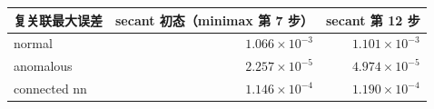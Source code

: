 \begin{tabular}{lrr}
\toprule
复关联最大误差 & secant 初态（minimax 第 7 步） & secant 第 12 步 \\
\midrule
normal & $1.066\times10^{-3}$ & $1.101\times10^{-3}$ \\
anomalous & $2.257\times10^{-5}$ & $4.974\times10^{-5}$ \\
connected nn & $1.146\times10^{-4}$ & $1.190\times10^{-4}$ \\
\bottomrule
\end{tabular}
